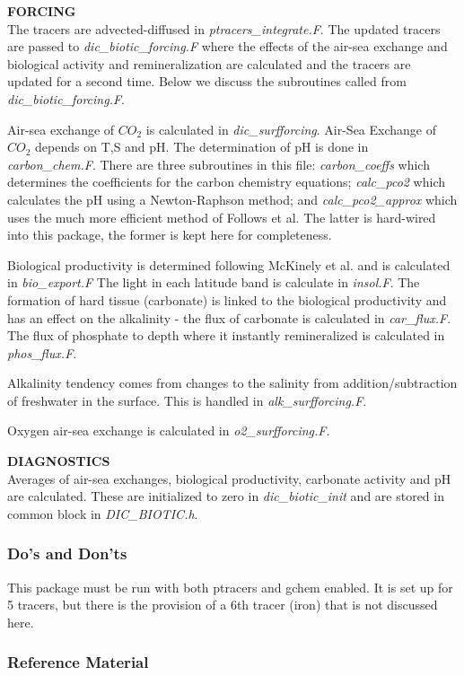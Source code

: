 \vspace{.5cm}

\noindent
{{\bf FORCING}}\\
The tracers are advected-diffused in {\it ptracers\_integrate.F}.
The updated tracers are passed to {\it dic\_biotic\_forcing.F}
where the effects of the air-sea exchange and biological
activity and remineralization are calculated and the tracers
are updated for a second time. Below we discuss the 
subroutines called from {\it dic\_biotic\_forcing.F}.


Air-sea exchange of $CO_2$ is calculated in {\it dic\_surfforcing}.
Air-Sea Exchange of $CO_2$ depends on T,S and pH. The determination
of pH is done in {\it carbon\_chem.F}. There are three subroutines
in this file: {\it carbon\_coeffs} which determines the coefficients
for the carbon chemistry equations; {\it calc\_pco2} which calculates
the pH using a Newton-Raphson method; and {\it calc\_pco2\_approx}
which uses the much more efficient method of Follows et al.
The latter is hard-wired into this package, the former is kept
here for completeness.

Biological productivity is determined following
McKinely et al. and is calculated in {\it bio\_export.F}
The light in each latitude band is calculate in {\it insol.F}.
The formation of hard tissue (carbonate) is linked to
the biological productivity and has an effect on the
alkalinity - the flux of carbonate is calculated in
{\it car\_flux.F}. The flux of phosphate to depth where
it instantly remineralized is calculated in {\it phos\_flux.F}.

Alkalinity tendency comes from changes to the salinity from
addition/subtraction of freshwater in the surface. This
is handled in {\it alk\_surfforcing.F}.

Oxygen air-sea exchange is calculated in {\it o2\_surfforcing.F}.
 
\vspace{.5cm}

\noindent
{{\bf DIAGNOSTICS}}\\
Averages of air-sea exchanges, biological productivity,
carbonate activity and pH are calculated. These are
initialized to zero in {\it dic\_biotic\_init} and
are stored in common block in {\it DIC\_BIOTIC.h}.

\subsubsection{Do's and Don'ts}

This package must be run with both ptracers and gchem enabled.
It is set up for 5 tracers, but there is the provision of
a 6th tracer (iron) that is not discussed here.

\subsubsection{Reference Material}

